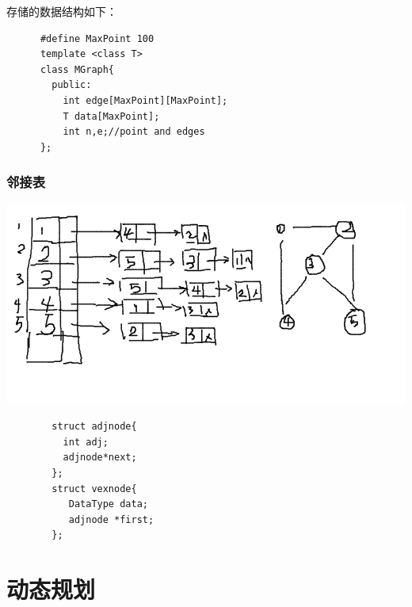 \documentclass{article}
\begin{document}
		存储的数据结构如下：
		\begin{verbatim}
      #define MaxPoint 100
      template <class T>
      class MGraph{
        public:
          int edge[MaxPoint][MaxPoint];
          T data[MaxPoint];
          int n,e;//point and edges
      };
		\end{verbatim}
		\subsubsection{邻接表}
		\includegraphics[scale=0.4]{./pic/graph-03.png}
		\begin{verbatim}
		struct adjnode{
		  int adj;
		  adjnode*next;
		};
		struct vexnode{
		   DataType data;
		   adjnode *first;
		}; 
		\end{verbatim}
		 
\section{动态规划}
\end{document}
